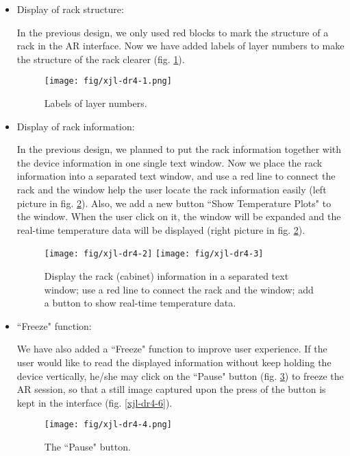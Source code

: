 \documentclass[11pt,a4paper]{article}
\begin{document}
\begin{onehalfspace}
\begin{itemize}
    \item[1.] Display of rack structure:
    
    In the previous design, we only used red blocks to mark the structure of a rack in the AR interface. Now we have added labels of layer numbers to make the structure of the rack clearer (fig. \ref{xjl-dr4-1}).
    
    \begin{figure}[H]
    \centering
    \texttt{[image: fig/xjl-dr4-1.png]}
    \caption{Labels of layer numbers.}
    \label{xjl-dr4-1}
    \end{figure}
    
    \item[2.] Display of rack information:
    
    In the previous design, we planned to put the rack information together with the device information in one single text window. Now we place the rack information into a separated text window, and use a red line to connect the rack and the window help the user locate the rack information easily (left picture in fig. \ref{xjl-dr4-2}). Also, we add a new button ``Show Temperature Plots" to the window. When the user click on it, the window will be expanded and the real-time temperature data will be displayed (right picture in fig. \ref{xjl-dr4-2}).
    
    \begin{figure}[H]
    \centering
    \texttt{[image: fig/xjl-dr4-2]}
    \quad
    \texttt{[image: fig/xjl-dr4-3]}
    \caption{Display the rack (cabinet) information in a separated text window; use a red line to connect the rack and the window; add a button to show real-time temperature data.}
    \label{xjl-dr4-2}
    \end{figure}
    
    
    \item[3.] ``Freeze" function:
    
    We have also added a ``Freeze" function to improve user experience. If the user would like to read the displayed information without keep holding the device vertically, he/she may click on the ``Pause" button (fig. \ref{xjl-dr4-4}) to freeze the AR session, so that a still image captured upon the press of the button is kept in the interface (fig. \ref{xjl-dr4-6}).
    
    \begin{figure}[H]
    \centering
    \texttt{[image: fig/xjl-dr4-4.png]}
    \caption{The ``Pause" button.}
    \label{xjl-dr4-4}
    \end{figure}
    

\end{itemize}
\end{onehalfspace}
\end{document}

